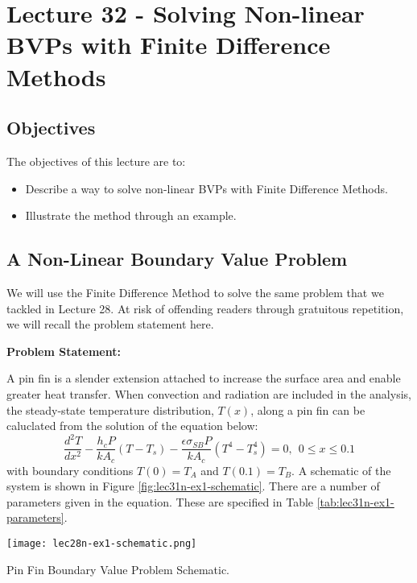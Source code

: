 \chapter{Lecture 32 - Solving Non-linear BVPs with Finite Difference Methods}
\label{ch:lec32n}
\section{Objectives}
The objectives of this lecture are to:
\begin{itemize}
\item Describe a way to solve non-linear BVPs with Finite Difference Methods.
\item Illustrate the method through an example.
\end{itemize}
\setcounter{lstannotation}{0}

\section{A Non-Linear Boundary Value Problem}
We will use the Finite Difference Method to solve the same problem that we tackled in Lecture 28.  At risk of offending readers through gratuitous repetition, we will recall the problem statement here.

\vspace{0.25cm}

\noindent\textbf{Problem Statement:}

\vspace{0.1cm}

\noindent A pin fin is a slender extension attached to increase the surface area and enable greater heat transfer.  When convection and radiation are included in the analysis, the steady-state temperature distribution, $T(x)$, along a pin fin can be caluclated from the solution of the equation below:
\begin{equation}
\frac{d^2T}{dx^2} - \frac{h_cP}{kA_c}\left(T - T_s\right)-\frac{\epsilon \sigma_{SB}P}{k A_c}\left(T^4 - T_s^4 \right) = 0, \ \ 0 \le x \le 0.1
\end{equation}
with boundary conditions $T(0)=T_A$ and $T(0.1)=T_B$.  A schematic of the system is shown in Figure \ref{fig:lec31n-ex1-schematic}.  There are a number of parameters given in the equation.  These are specified in Table \ref{tab:lec31n-ex1-parameters}.
\begin{marginfigure}[-4.5cm]
\texttt{[image: lec28n-ex1-schematic.png]}
\caption{Pin Fin Boundary Value Problem Schematic.}
\label{fig:lec31n-ex1-schematic}
\end{marginfigure}

